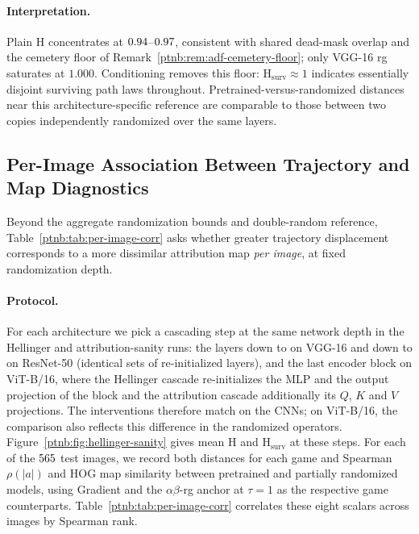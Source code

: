 \paragraph{Interpretation.}
Plain $\mathrm H$ concentrates at $0.94$--$0.97$, consistent with shared dead-mask overlap and the cemetery floor of Remark~\ref{ptnb:rem:adf-cemetery-floor}; only VGG-16 \ac{rg} saturates at $1.000$. Conditioning removes this floor: $\mathrm H_{\mathrm{surv}}\approx1$ indicates essentially disjoint surviving path laws throughout. Pretrained-versus-randomized distances near this architecture-specific reference are comparable to those between two copies independently randomized over the same layers.

\subsection{Per-Image Association Between Trajectory and Map Diagnostics}\label{ptnb:sec:per-image-orthogonality}

Beyond the aggregate randomization bounds and double-random reference, Table~\ref{ptnb:tab:per-image-corr} asks whether greater trajectory displacement corresponds to a more dissimilar attribution map \emph{per image}, at fixed randomization depth.

\paragraph{Protocol.}
For each architecture we pick a cascading step at the same network depth in the Hellinger
and attribution-sanity runs: the layers down to  on VGG-16 and down to
 on ResNet-50 (identical sets of re-initialized layers), and the last
encoder block on ViT-B/16, where the Hellinger cascade re-initializes the MLP and the output
projection of the block and the attribution cascade additionally its $Q$, $K$ and $V$ projections.
The interventions therefore match on the CNNs; on ViT-B/16, the comparison also reflects this
difference in the randomized operators.
Figure~\ref{ptnb:fig:hellinger-sanity} gives mean $\mathrm H$ and $\mathrm H_{\mathrm{surv}}$ at these steps. For each of the $565$ test images, we record both distances for each game and Spearman $\rho(|a|)$ and HOG map similarity between pretrained and partially randomized models, using Gradient and the $\alpha\beta$-\ac{rg} anchor at $\tau=1$ as the respective game counterparts. Table~\ref{ptnb:tab:per-image-corr} correlates these eight scalars across images by Spearman rank.

